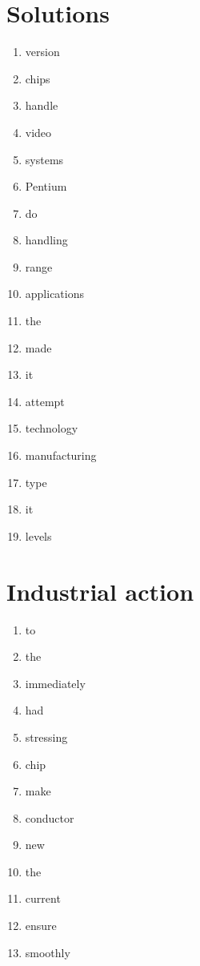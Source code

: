 \section{Solutions}
\begin{multicols}{2}
\begin{enumerate}
\item version \label{item:Page1_FillGaps_G1}
\item chips \label{item:Page1_FillGaps_G2}
\item handle \label{item:Page1_FillGaps_G3}
\item video \label{item:Page1_FillGaps_G4}
\item systems \label{item:Page1_FillGaps_G5}
\item Pentium \label{item:Page1_FillGaps_G6}
\item do \label{item:Page1_FillGaps_G7}
\item handling \label{item:Page1_FillGaps_G8}
\item range \label{item:Page1_FillGaps_G9}
\item applications \label{item:Page1_FillGaps_G10}
\item the \label{item:Page1_FillGaps_G11}
\item made \label{item:Page1_FillGaps_G12}
\item it \label{item:Page1_FillGaps_G13}
\item attempt \label{item:Page1_FillGaps_G14}
\item technology \label{item:Page1_FillGaps_G15}
\item manufacturing \label{item:Page1_FillGaps_G16}
\item type \label{item:Page1_FillGaps_G17}
\item it \label{item:Page1_FillGaps_G18}
\item levels \label{item:Page1_FillGaps_G19}
\end{enumerate}
\end{multicols}

\section{Industrial action}
\begin{multicols}{2}
\begin{enumerate}
\item to
\item the
\item immediately
\item had
\item stressing
\item chip
\item make
\item conductor
\item new
\item the
\item current
\item ensure
\item smoothly
\end{enumerate}
\end{multicols}


